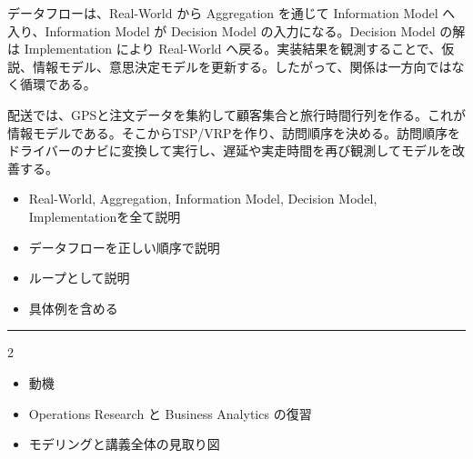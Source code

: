 データフローは、Real-World から Aggregation を通じて Information Model へ入り、Information Model が Decision Model の入力になる。Decision Model の解は Implementation により Real-World へ戻る。実装結果を観測することで、仮説、情報モデル、意思決定モデルを更新する。したがって、関係は一方向ではなく循環である。\par
{}
配送では、GPSと注文データを集約して顧客集合と旅行時間行列を作る。これが情報モデルである。そこからTSP/VRPを作り、訪問順序を決める。訪問順序をドライバーのナビに変換して実行し、遅延や実走時間を再び観測してモデルを改善する。\par
{}
\begin{itemize}
\item Real-World, Aggregation, Information Model, Decision Model, Implementationを全て説明
\item データフローを正しい順序で説明
\item ループとして説明
\item 具体例を含める
\end{itemize}
\vspace{2mm}\hrule\vspace{2mm}

\clearpage
{}
\begin{multicols}{2}\scriptsize\raggedcolumns
{}
\begin{itemize}
\item 動機
\item Operations Research と Business Analytics の復習
\item モデリングと講義全体の見取り図
\end{itemize}
\end{multicols}

